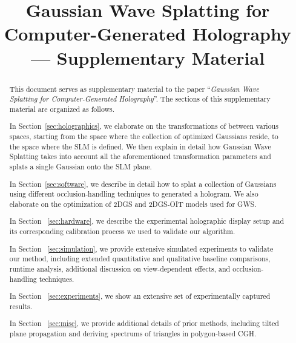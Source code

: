 \documentclass[acmtog,nonacm]{acmart}
\begin{document}
\title{Gaussian Wave Splatting for Computer-Generated Holography --- Supplementary Material}
\begin{abstract}
    This document serves as supplementary material to the paper ``\textit{Gaussian Wave Splatting for Computer-Generated Holography}''. The sections of this supplementary material are organized as follows. 
    
    In Section~\ref{sec:holographics}, we elaborate on the transformations of between various spaces, starting from the space where the collection of optimized Gaussians reside, to the space where the SLM is defined. We then explain in detail how Gaussian Wave Splatting takes into account all the aforementioned transformation parameters and splats a single Gaussian onto the SLM plane. 
    
    In Section~\ref{sec:software}, we describe in detail how to splat a collection of Gaussians using different occlusion-handling techniques to generated a hologram. We also elaborate on the optimization of 2DGS and 2DGS-OIT models used for GWS.

    In Section ~\ref{sec:hardware}, we describe the experimental holographic display setup and its corresponding calibration process we used to validate our algorithm.

    In Section ~\ref{sec:simulation}, we provide extensive simulated experiments to validate our method, including extended quantitative and qualitative baseline comparisons, runtime analysis, additional discussion on view-dependent effects, and occlusion-handling techniques.

    In Section ~\ref{sec:experiments}, we show an extensive set of experimentally captured results. 

    In Section ~\ref{sec:misc}, we provide additional details of prior methods, including tilted plane propagation and deriving spectrums of triangles in polygon-based CGH.
    
\end{abstract}
\end{document}
